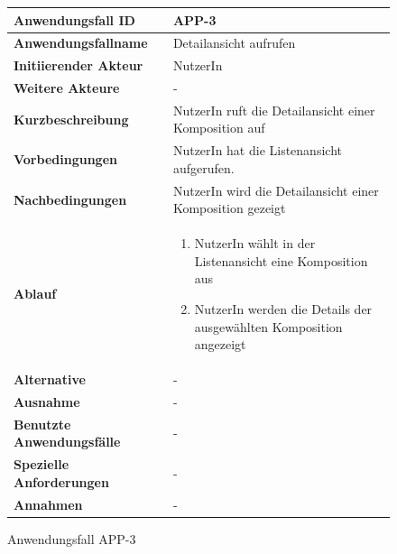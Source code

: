 \begin{figure}[h]
	\centering
	\begin{tabularx}{\textwidth}{ X | X }
		\textbf{Anwendungsfall ID} & APP-3 \\ \hline
		\textbf{Anwendungsfallname} & Detailansicht aufrufen \\ \hline
		\textbf{Initiierender Akteur} & NutzerIn \\ \hline
		\textbf{Weitere Akteure} & -  \\ \hline
		\textbf{Kurzbeschreibung} & NutzerIn ruft die Detailansicht einer Komposition auf  \\ \hline
		\textbf{Vorbedingungen} & NutzerIn hat die Listenansicht aufgerufen.  \\ \hline
		\textbf{Nachbedingungen} & NutzerIn wird die Detailansicht einer Komposition gezeigt \\ \hline
		\textbf{Ablauf} &
		\begin{enumerate}
			\item NutzerIn wählt in der Listenansicht eine Komposition aus
			\item NutzerIn werden die Details der ausgewählten Komposition angezeigt
		\end{enumerate} \\ \hline
		\textbf{Alternative} &
		-  \\ \hline
		\textbf{Ausnahme} &
		- \\ \hline
		\textbf{Benutzte Anwendungsfälle} & - \\ \hline
		\textbf{Spezielle Anforderungen} & - \\ \hline
		\textbf{Annahmen} & -
	\end{tabularx}
	\caption{Anwendungsfall APP-3}
	\label{fig:anwendungsfall-app-tabelle-APP-3}
\end{figure}

\newpage

